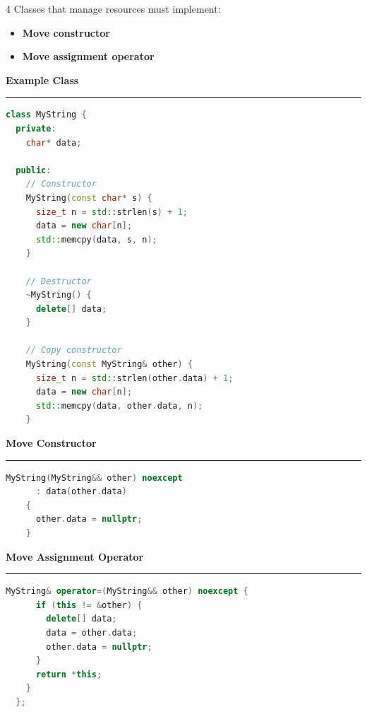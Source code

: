 \documentclass[final]{beamer}
\renewcommand{\subsection}[1]{%
  \par\vspace{1em}%
  {\noindent\large\bfseries #1\par}%
  \vspace{0.5em}\hrule\vspace{1em}%

}
\begin{document}
\begin{frame}[t,fragile]
\begin{multicols}{4}
  Classes that manage resources must implement:

  \begin{itemize}
    \item \textbf{Move constructor}
    \item \textbf{Move assignment operator}
  \end{itemize}

  \subsection{Example Class}

  \begin{lstlisting}[language=C++]
  class MyString {
  private:
    char* data;

  public:
    // Constructor
    MyString(const char* s) {
      size_t n = std::strlen(s) + 1;
      data = new char[n];
      std::memcpy(data, s, n);
    }

    // Destructor
    ~MyString() {
      delete[] data;
    }

    // Copy constructor
    MyString(const MyString& other) {
      size_t n = std::strlen(other.data) + 1;
      data = new char[n];
      std::memcpy(data, other.data, n);
    }
  \end{lstlisting}

  \subsection{Move Constructor}

  \begin{lstlisting}[language=C++]
    MyString(MyString&& other) noexcept
      : data(other.data)
    {
      other.data = nullptr;
    }
  \end{lstlisting}

  \subsection{Move Assignment Operator}

  \begin{lstlisting}[language=C++]
    MyString& operator=(MyString&& other) noexcept {
      if (this != &other) {
        delete[] data;
        data = other.data;
        other.data = nullptr;
      }
      return *this;
    }
  };
  \end{lstlisting}
 
 
\end{multicols}

\end{frame}
\end{document}
